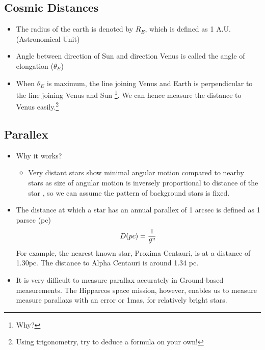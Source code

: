 \documentclass{article}
\begin{document}
\subsection{Cosmic Distances}
\begin{itemize}

\item The radius of the earth is denoted by $R_E$, which is defined as 1 A.U. (Astronomical Unit)

\item Angle between direction of Sun and direction Venus is called the angle of elongation ($\theta_E$)

\item When $\theta_E$ is maximum, the line joining Venus and Earth is perpendicular to the line joining Venus and Sun \footnote{Why?}. We can hence measure the distance to Venus easily.\footnote{Using trigonometry, try to deduce a formula on your own!}
\end{itemize}
\subsection{Parallex}
\begin{itemize}
\item Why it works?
\begin{itemize}
\item Very distant stars show minimal angular motion compared to nearby stars as size of angular motion is inversely proportional to distance of the star , so we can assume the pattern of
 background stars is fixed.
\end{itemize}
\item The distance at which a star has an annual parallex of 1 arcsec is defined as 1 parsec (pc)
\begin{equation}
D(pc)=\frac{1}{\theta"}
\end{equation}
For example, the nearest known star, Proxima Centauri, is at a distance of 1.30pc. The distance to Alpha Centauri is around 1.34 pc. 
\item It is very difficult to measure parallax accurately in Ground-based measurements. The Hipparcos space mission, however, enables us to measure measure parallaxs with an error or 1mas, for relatively bright stars.
\end{itemize}
\end{document}
